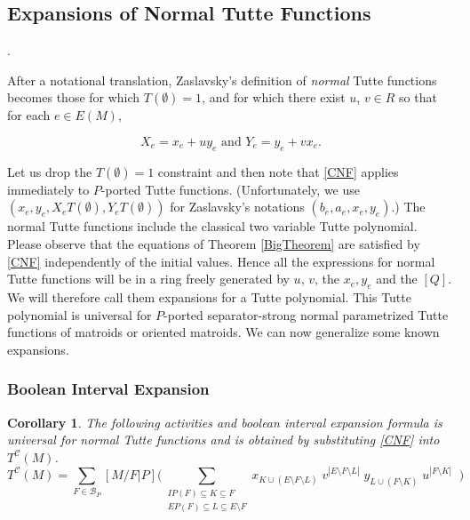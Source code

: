 \documentclass[12pt,leqno]{amsart}
\newtheorem{cor}[lem]{Corollary}
\theoremstyle{remark}
\newcommand{\Card}[1]{\ensuremath{{\left|#1\right|}}}
\begin{document}
\subsection{Expansions of Normal Tutte Functions}
\label{NormalSubSec}.

After a notational translation, 
Zaslavsky's \cite{MR93a:05047} definition of \emph{normal} Tutte 
functions becomes
those for which $T(\emptyset)=1$, and for which there exist
$u$, $v\in R$ so that for each $e\in E(M)$,

\begin{equation}
\tag{CNF}
\label{CNF}
X_e = x_e + uy_e \text{ and } Y_e = y_e + vx_e.
\end{equation}

Let us drop the $T(\emptyset)=1$ constraint and then
note that \eqref{CNF} applies immediately to $P$-ported Tutte functions.
(Unfortunately, we use 
$(x_e, y_e, X_eT(\emptyset), Y_eT(\emptyset))$ for Zaslavsky's
notations $(b_e, a_e, x_e, y_e)$.)  The normal Tutte functions
include the classical two variable Tutte polynomial.
Please observe that the equations of Theorem \ref{BigTheorem}
are satisfied by \eqref{CNF} independently of the
initial values.  Hence all the expressions for normal Tutte
functions will be in a ring freely generated by
$u$, $v$, the $x_e, y_e$ and the $[Q]$.  We will therefore
call them expansions for a Tutte polynomial.  This
Tutte polynomial is universal for $P$-ported separator-strong
normal parametrized Tutte functions of matroids or oriented matroids.
We can now generalize some known expansions.

\subsubsection{Boolean Interval Expansion}

\begin{cor}
\label{NormalActProp}
The following activities and boolean interval expansion formula
is universal for normal Tutte functions and
is obtained by substituting \eqref{CNF} 
into $T^{\mathcal{C}}(M)$.
\begin{equation}
T^{\mathcal{C}}(M)=
\sum_{F\in \mathcal{B}_P}[M/F|P]
\Big(
\sum_{\substack{
       IP(F)\subseteq K \subseteq F\\
       EP(F)\subseteq L \subseteq E\setminus F
      }}
 x_{K\cup (E\setminus F\setminus L)}\;
 v^{\Card{E\setminus F\setminus L}}\;
 y_{L\cup (F\setminus K)}\;
 u^{\Card{F\setminus K}}\;\;
\Big)
\end{equation}
\end{cor}
\end{document}
